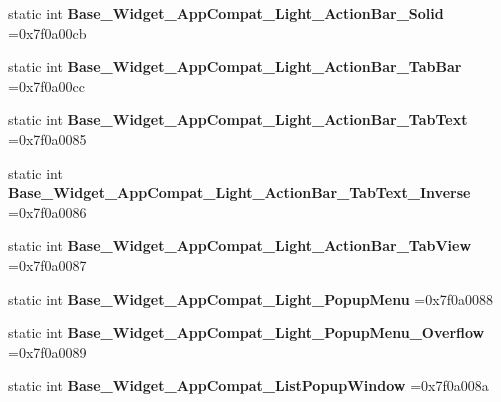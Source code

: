 \begin{DoxyCompactItemize}
static int {\bfseries Base\+\_\+\+Widget\+\_\+\+App\+Compat\+\_\+\+Light\+\_\+\+Action\+Bar\+\_\+\+Solid} =0x7f0a00cb
\item 
\mbox{\label{classandroid_1_1support_1_1design_1_1R_1_1style_a0e1075252ddf75376ca5b3a58f7f5f8c}} 
static int {\bfseries Base\+\_\+\+Widget\+\_\+\+App\+Compat\+\_\+\+Light\+\_\+\+Action\+Bar\+\_\+\+Tab\+Bar} =0x7f0a00cc
\item 
\mbox{\label{classandroid_1_1support_1_1design_1_1R_1_1style_ab686b6442e41a12258fee1e2ecfa0a8d}} 
static int {\bfseries Base\+\_\+\+Widget\+\_\+\+App\+Compat\+\_\+\+Light\+\_\+\+Action\+Bar\+\_\+\+Tab\+Text} =0x7f0a0085
\item 
\mbox{\label{classandroid_1_1support_1_1design_1_1R_1_1style_a9fbff18e1defd583f2f06fb1bc2a4b8a}} 
static int {\bfseries Base\+\_\+\+Widget\+\_\+\+App\+Compat\+\_\+\+Light\+\_\+\+Action\+Bar\+\_\+\+Tab\+Text\+\_\+\+Inverse} =0x7f0a0086
\item 
\mbox{\label{classandroid_1_1support_1_1design_1_1R_1_1style_a888321a63b0cc99bbf4b637071260a2c}} 
static int {\bfseries Base\+\_\+\+Widget\+\_\+\+App\+Compat\+\_\+\+Light\+\_\+\+Action\+Bar\+\_\+\+Tab\+View} =0x7f0a0087
\item 
\mbox{\label{classandroid_1_1support_1_1design_1_1R_1_1style_af449e9e976ed594fd1c4929d8c03fcf1}} 
static int {\bfseries Base\+\_\+\+Widget\+\_\+\+App\+Compat\+\_\+\+Light\+\_\+\+Popup\+Menu} =0x7f0a0088
\item 
\mbox{\label{classandroid_1_1support_1_1design_1_1R_1_1style_a8054b7c88571e98645bef36b01bd6898}} 
static int {\bfseries Base\+\_\+\+Widget\+\_\+\+App\+Compat\+\_\+\+Light\+\_\+\+Popup\+Menu\+\_\+\+Overflow} =0x7f0a0089
\item 
\mbox{\label{classandroid_1_1support_1_1design_1_1R_1_1style_a822da361c231007514cf652f770be442}} 
static int {\bfseries Base\+\_\+\+Widget\+\_\+\+App\+Compat\+\_\+\+List\+Popup\+Window} =0x7f0a008a

\end{DoxyCompactItemize}
